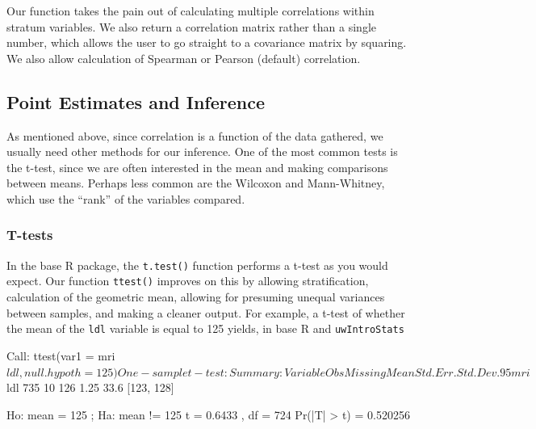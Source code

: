 \documentclass[landscape]{article}
\renewenvironment{Schunk}{\vspace{\topsep}}{\vspace{\topsep}}
\begin{document}
Our function takes the pain out of calculating multiple correlations within stratum variables. We also return a correlation matrix rather than a single number, which allows the user to go straight to a covariance matrix by squaring. We also allow calculation of Spearman or Pearson (default) correlation.

\subsection{Point Estimates and Inference}
As mentioned above, since correlation is a function of the data gathered, we usually need other methods for our inference. One of the most common tests is the t-test, since we are often interested in the mean and making comparisons between means. Perhaps less common are the Wilcoxon and Mann-Whitney, which use the ``rank'' of the variables compared.   
\subsubsection{T-tests}
In the base R package, the \texttt{t.test()} function performs a t-test as you would expect. Our function \texttt{ttest()} improves on this by allowing stratification, calculation of the geometric mean, allowing for presuming unequal variances between samples, and making a cleaner output. For example, a t-test of whether the mean of the \texttt{ldl} variable is equal to 125 yields, in base R and \texttt{uwIntroStats}
\begin{Schunk}
\begin{Soutput}
Call:
ttest(var1 = mri$ldl, null.hypoth = 125)

One-sample t-test :
 
Summary:
 Variable Obs Missing Mean Std. Err. Std. Dev.     95%
  mri$ldl 735      10  126      1.25      33.6 [123, 128]

 Ho:  mean = 125 ; 
 Ha:  mean != 125 
 t = 0.6433 , df = 724 
 Pr(|T| > t) =  0.520256 
\end{Soutput}
\end{Schunk}
\end{document}

